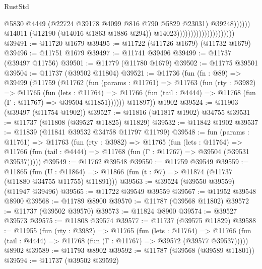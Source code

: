 \begin{lexlean}{RustStd}
\begin{coremodule}
                                                          @5830
                                                          @4449
                                                          (@22724
                                                            @39178
                                                            @4099
                                                            @816
                                                            @790
                                                            @5829
                                                            @23031)
                                                          @39248))))))
                                              @14011
                                              (@12190 (@14016 @1863 @1886 @294))
                                              @14023)))))))))))))))))))))
@39491 := @11720 @1679
@39495 := @11722 (@11726 @1679) (@11732 @1679)
@39496 := @11751 @1679
@39497 := @11741 @39496
@39499 := @11737 (@39497 @11756)
@39501 := @11779 (@11780 @1679)
@39502 := @11775 @39501
@39504 := @11737 (@39502 @11804)
@39521 := @11736
    (fun (fn : @89) =>
    @39499
      (@11759
        (@11762
          (fun (params : @11761) =>
          @11763
            (fun (rty : @3982) =>
            @11765
              (fun (lets : @11764) =>
              @11766 (fun (tail : @4444) => @11768 (fun (Γ : @11767) => @39504 @11851))))))
        @11897))
    @1902
@39524 := @11903 (@39497 (@11754 @1902))
@39527 := @11816 (@11817 @1902) @34755
@39531 := @11737 (@11808 (@39527 @11825) @11829)
@39532 := @11842 @1902
@39537 := @11839 (@11841 @39532 @34758 @11797 @11799)
@39548 := fun (params : @11761) =>
  @11763
    (fun (rty : @3982) =>
    @11765
      (fun (lets : @11764) =>
      @11766 (fun (tail : @4444) => @11768 (fun (Γ : @11767) => @39504 (@39531 @39537)))))
@39549 := @11762 @39548
@39550 := @11759 @39549
@39559 := @11865
    (fun (U : @11864) => @11866 (fun (t : @7) => @11874 (@11737 (@11880 @34755 @11755) @11891)))
@39563 := @39524 (@39550 @39559) (@11947 @39496)
@39565 := @11722 @39549 @39559
@39567 := @11952 @39548 @8900
@39568 := @11789 @8900
@39570 := @11787 (@39568 @11802)
@39572 := @11737 (@39502 @39570)
@39573 := @11824 @8900
@39574 := @39527 @39573
@39575 := @11808 @39574
@39577 := @11737 (@39575 @11829)
@39588 := @11955
    (fun (rty : @3982) =>
    @11765
      (fun (lets : @11764) =>
      @11766 (fun (tail : @4444) => @11768 (fun (Γ : @11767) => @39572 (@39577 @39537)))))
    @8902
@39589 := @11793 @8902
@39592 := @11787 (@39568 (@39589 @11801))
@39594 := @11737 (@39502 @39592)

\end{coremodule}
\end{lexlean}
